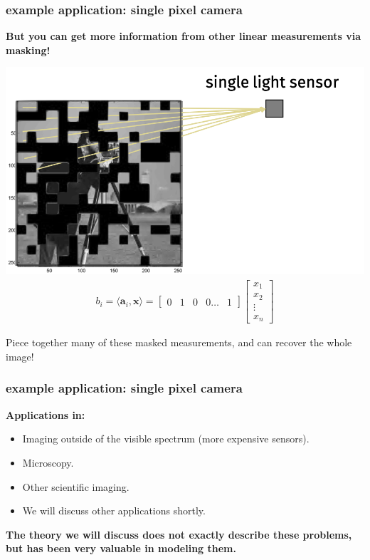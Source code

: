 \documentclass[compress]{beamer}
\newcommand{\bv}[1]{\mathbf{#1}}
\begin{document}
\begin{frame}
	\frametitle{example application: single pixel camera}
	\begin{center}
		\textbf{But you can get more information from other linear measurements via masking!}
		
		\vspace{-.5em}
		\includegraphics[width=.6\textwidth]{maskedImage.png}
		\vspace{-1.5em}
		\begin{align*}
			b_i =\langle \bv{a}_i,\bv{x} \rangle = \begin{bmatrix}0 &1 & 0 & 0 \ldots& 1\end{bmatrix}\begin{bmatrix}x_1 \\x_2 \\\vdots\\ x_n\end{bmatrix}
		\end{align*}
	\end{center}
	Piece together many of these masked measurements, and can recover the whole image!
\end{frame}

\begin{frame}
	\frametitle{example application: single pixel camera}
	\textbf{Applications in:}
	\begin{itemize}
		\item Imaging outside of the visible spectrum (more expensive sensors).
		\item Microscopy.
		\item Other scientific imaging.
		\item We will discuss other applications shortly.
	\end{itemize}
	\begin{center}
		\alert{\textbf{The theory we will discuss does not exactly describe these problems, but has been very valuable in modeling them.}}
	\end{center}
\end{frame}
\end{document}
